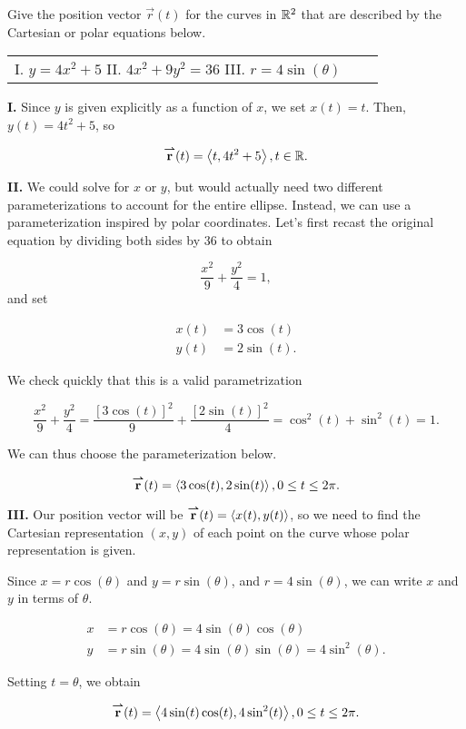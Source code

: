 \documentclass[noauthor, handout]{ximera}
\begin{document}
\begin{problem}
Give the position vector $\vec{r}(t)$ for the curves in $\mathbb R^2$ that are described by the Cartesian or polar equations below.

\begin{center}
\begin{tabular}{lll}
I. $y=4x^2+5$ \qquad \qquad II. $4x^2+9y^2=36$ \qquad \qquad  III. $r = 4\sin(\theta)$
\end{tabular}
\end{center}

\begin{freeResponse}
\textbf{I.} Since $y$ is given explicitly as a function of $x$, we set $x(t)=t$.  Then, $y(t) = 4t^2+5$, so 

\[
{\overset{\boldsymbol{\rightharpoonup}}{\mathbf{r}}}(t) = \left\langle t,4t^2+5\right\rangle , t \in \mathbb R.
\]

\textbf{II.} We could solve for $x$ or $y$, but would actually need two different parameterizations to account for the entire ellipse.  Instead, we can use a parameterization inspired by polar coordinates.  Let's first recast the original equation by dividing both sides by 36 to obtain

\[
\frac{x^2}{9}+\frac{y^2}{4} = 1,
\]
and set

\begin{align*}
x(t) &= 3 \cos(t) \\
y(t) &= 2 \sin(t).
\end{align*}

We check quickly that this is a valid parametrization

\[
\frac{x^2}{9}+\frac{y^2}{4} =\frac{\left[3 \cos(t) \right]^2}{9~}+\frac{\left[ 2 \sin(t) \right]^2}{4~} =\cos^2(t)+\sin^2(t) = 1.\]

We can thus choose the parameterization below.

\[
{\overset{\boldsymbol{\rightharpoonup}}{\mathbf{r}}}(t) = \left\langle 3\cos(t),2\sin(t)\right\rangle , 0 \leq t \leq 2 \pi.
\]

\textbf{III.} Our position vector will be ${\overset{\boldsymbol{\rightharpoonup}}{\mathbf{r}}}(t)=\left\langle x(t),y(t)\right\rangle$, so we need to find the Cartesian representation $(x,y)$ of each point on the curve whose polar representation is given.

Since $x=r\cos(\theta)$ and $y=r\sin(\theta)$, and $r= 4\sin(\theta)$, we can write $x$ and $y$ in terms of $\theta$.

\begin{align*}
x &= r \cos(\theta) = 4\sin(\theta)\cos(\theta) \\
y &= r \sin(\theta) = 4\sin(\theta)\sin(\theta) =4 \sin^2(\theta) .
\end{align*}

Setting $t=\theta$, we obtain

\[
{\overset{\boldsymbol{\rightharpoonup}}{\mathbf{r}}}(t) = \left\langle 4\sin(t)\cos(t),4 \sin^2(t)\right\rangle , 0 \leq t \leq 2\pi.
\]


\end{freeResponse}
\end{problem}
\end{document}
